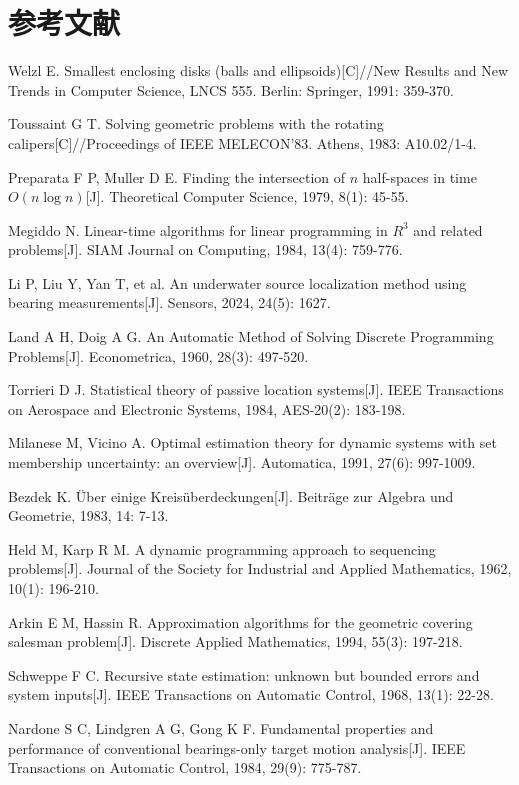 \documentclass[12pt,a4paper]{article}
\begin{document}
\section*{参考文献}
\begin{enumerate}[leftmargin=1.8em,itemsep=0.28em,label={[\arabic*]}]
\item Welzl E. Smallest enclosing disks (balls and ellipsoids)[C]//New Results and New Trends in Computer Science, LNCS 555. Berlin: Springer, 1991: 359-370.
\item Toussaint G T. Solving geometric problems with the rotating calipers[C]//Proceedings of IEEE MELECON'83. Athens, 1983: A10.02/1-4.
\item Preparata F P, Muller D E. Finding the intersection of $n$ half-spaces in time $O(n\log n)$[J]. Theoretical Computer Science, 1979, 8(1): 45-55.
\item Megiddo N. Linear-time algorithms for linear programming in $R^{3}$ and related problems[J]. SIAM Journal on Computing, 1984, 13(4): 759-776.
\item Li P, Liu Y, Yan T, et al. An underwater source localization method using bearing measurements[J]. Sensors, 2024, 24(5): 1627.
\item Land A H, Doig A G. An Automatic Method of Solving Discrete Programming Problems[J]. Econometrica, 1960, 28(3): 497-520.
\item Torrieri D J. Statistical theory of passive location systems[J]. IEEE Transactions on Aerospace and Electronic Systems, 1984, AES-20(2): 183-198.
\item Milanese M, Vicino A. Optimal estimation theory for dynamic systems with set membership uncertainty: an overview[J]. Automatica, 1991, 27(6): 997-1009.
\item Bezdek K. \"{U}ber einige Kreis\"{u}berdeckungen[J]. Beitr\"{a}ge zur Algebra und Geometrie, 1983, 14: 7-13.
\item Held M, Karp R M. A dynamic programming approach to sequencing problems[J]. Journal of the Society for Industrial and Applied Mathematics, 1962, 10(1): 196-210.
\item Arkin E M, Hassin R. Approximation algorithms for the geometric covering salesman problem[J]. Discrete Applied Mathematics, 1994, 55(3): 197-218.
\item Schweppe F C. Recursive state estimation: unknown but bounded errors and system inputs[J]. IEEE Transactions on Automatic Control, 1968, 13(1): 22-28.
\item Nardone S C, Lindgren A G, Gong K F. Fundamental properties and performance of conventional bearings-only target motion analysis[J]. IEEE Transactions on Automatic Control, 1984, 29(9): 775-787.
\end{enumerate}
\end{document}
